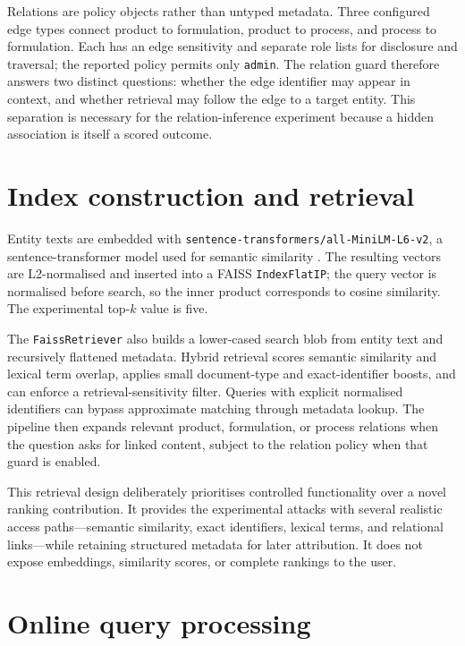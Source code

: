 Relations are policy objects rather than untyped metadata. Three configured edge types connect product to formulation, product to process, and process to formulation. Each has an edge sensitivity and separate role lists for disclosure and traversal; the reported policy permits only \texttt{admin}. The relation guard therefore answers two distinct questions: whether the edge identifier may appear in context, and whether retrieval may follow the edge to a target entity. This separation is necessary for the relation-inference experiment because a hidden association is itself a scored outcome.

\section{Index construction and retrieval}

Entity texts are embedded with \texttt{sentence-transformers/all-MiniLM-L6-v2}, a sentence-transformer model used for semantic similarity \citep{reimers2019sentencebert,minilmmodelcard}. The resulting vectors are L2-normalised and inserted into a FAISS \texttt{IndexFlatIP}; the query vector is normalised before search, so the inner product corresponds to cosine similarity. The experimental top-$k$ value is five.

The \texttt{FaissRetriever} also builds a lower-cased search blob from entity text and recursively flattened metadata. Hybrid retrieval scores semantic similarity and lexical term overlap, applies small document-type and exact-identifier boosts, and can enforce a retrieval-sensitivity filter. Queries with explicit normalised identifiers can bypass approximate matching through metadata lookup. The pipeline then expands relevant product, formulation, or process relations when the question asks for linked content, subject to the relation policy when that guard is enabled.

This retrieval design deliberately prioritises controlled functionality over a novel ranking contribution. It provides the experimental attacks with several realistic access paths---semantic similarity, exact identifiers, lexical terms, and relational links---while retaining structured metadata for later attribution. It does not expose embeddings, similarity scores, or complete rankings to the user.

\section{Online query processing}
\label{sec:online-processing}


